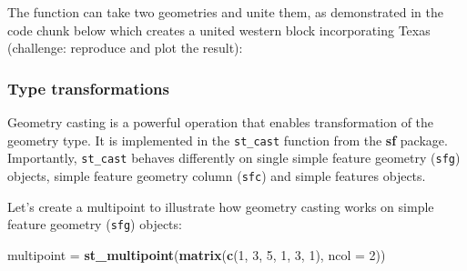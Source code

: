 \documentclass[]{krantz}
\newenvironment{Shaded}{\begin{snugshade}}{\end{snugshade}}
\newcommand{\DataTypeTok}[1]{\textcolor[rgb]{0.27,0.27,0.27}{#1}}
\newcommand{\DecValTok}[1]{\textcolor[rgb]{0.06,0.06,0.06}{#1}}
\newcommand{\KeywordTok}[1]{\textcolor[rgb]{0.27,0.27,0.27}{\textbf{#1}}}
\newcommand{\NormalTok}[1]{#1}
\newcommand{\OperatorTok}[1]{\textcolor[rgb]{0.43,0.43,0.43}{\textbf{#1}}}
\newcommand{\StringTok}[1]{\textcolor[rgb]{0.5,0.5,0.5}{#1}}
\begin{document}
\begin{Shaded}
\end{Shaded}

The function can take two geometries and unite them, as demonstrated in the code chunk below which creates a united western block incorporating Texas (challenge: reproduce and plot the result):

\begin{Shaded}
\end{Shaded}

\hypertarget{type-trans}{%
\subsubsection{Type transformations}\label{type-trans}}

Geometry casting is a powerful operation that enables transformation of the geometry type.
It is implemented in the \texttt{st\_cast} function from the \textbf{sf} package.
Importantly, \texttt{st\_cast} behaves differently on single simple feature geometry (\texttt{sfg}) objects, simple feature geometry column (\texttt{sfc}) and simple features objects.

Let's create a multipoint to illustrate how geometry casting works on simple feature geometry (\texttt{sfg}) objects:

\begin{Shaded}
\begin{Highlighting}[]
\NormalTok{multipoint =}\StringTok{ }\KeywordTok{st_multipoint}\NormalTok{(}\KeywordTok{matrix}\NormalTok{(}\KeywordTok{c}\NormalTok{(}\DecValTok{1}\NormalTok{, }\DecValTok{3}\NormalTok{, }\DecValTok{5}\NormalTok{, }\DecValTok{1}\NormalTok{, }\DecValTok{3}\NormalTok{, }\DecValTok{1}\NormalTok{), }\DataTypeTok{ncol =} \DecValTok{2}\NormalTok{))}
\end{Highlighting}
\end{Shaded}
\end{document}

